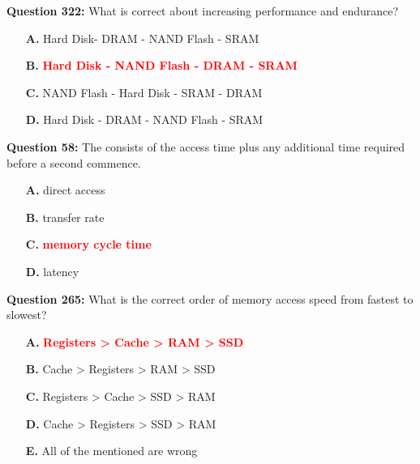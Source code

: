 \documentclass[12pt,a4paper]{article}
\begin{document}
\vspace{0.5cm}

\textbf{Question 322:} What is correct about increasing performance and endurance?

\begin{itemize}
    \item[\textbf{A.}] Hard Disk- DRAM - NAND Flash - SRAM
    \item[\textbf{B.}] \textcolor{red}{\textbf{Hard Disk - NAND Flash - DRAM - SRAM}}
    \item[\textbf{C.}] NAND Flash - Hard Disk - SRAM - DRAM
    \item[\textbf{D.}] Hard Disk - DRAM - NAND Flash - SRAM
\end{itemize}

\vspace{0.5cm}

\vspace{0.5cm}

\textbf{Question 58:} The \underline{\hspace{1.5cm}} consists of the access time plus any additional time required before a second commence.

\begin{itemize}
    \item[\textbf{A.}] direct access
    \item[\textbf{B.}] transfer rate
    \item[\textbf{C.}] \textcolor{red}{\textbf{memory cycle time}}
    \item[\textbf{D.}] latency
\end{itemize}

\vspace{0.5cm}

\vspace{0.5cm}

\vspace{0.5cm}

\vspace{0.5cm}

\textbf{Question 265:} What is the correct order of memory access speed from fastest to slowest?

\begin{itemize}
    \item[\textbf{A.}] \textcolor{red}{\textbf{Registers > Cache > RAM > SSD}}
    \item[\textbf{B.}] Cache > Registers > RAM > SSD
    \item[\textbf{C.}] Registers > Cache > SSD > RAM
    \item[\textbf{D.}] Cache > Registers > SSD > RAM
    \item[\textbf{E.}] All of the mentioned are wrong
\end{itemize}
\end{document}
